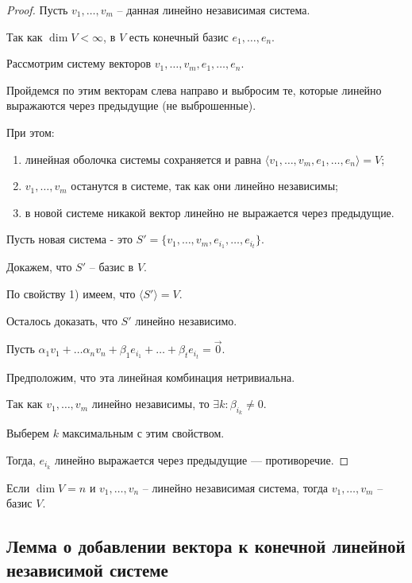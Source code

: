 \begin{proof}
    Пусть $v_1, \dots, v_m$ -- данная линейно независимая система.

    Так как $\dim V < \infty$, в $V$ есть конечный базис $e_1, \dots, e_n$.

    Рассмотрим систему векторов $v_1, \dots, v_m, e_1, \dots, e_n$.

    Пройдемся по этим векторам слева направо и выбросим те, которые линейно выражаются через предыдущие (не выброшенные).

    При этом:
    \begin{enumerate}[nosep, label=\arabic*)]
    \item линейная оболочка системы сохраняется и равна $\langle v_1, \dots, v_m, e_1, \dots, e_n \rangle = V$;
    \item $v_1, \dots, v_m$ останутся в системе, так как они линейно независимы;
    \item в новой системе никакой вектор линейно не выражается через предыдущие.
    \end{enumerate}

    Пусть новая система - это $S' = \{v_1, \dots, v_m, e_{i_1}, \dots, e_{i_t}\}$.

    Докажем, что $S'$ -- базис в $V$.

    По свойству 1) имеем, что $\langle S' \rangle = V$.

    Осталось доказать, что $S'$ линейно независимо.

    Пусть $\alpha_1 v_1 + \dots \alpha_n v_n + \beta_1 e_{i_1} + \dots + \beta_t e_{i_t} = \overrightarrow{0}$.

    Предположим, что эта линейная комбинация нетривиальна.

    Так как $v_1, \dots, v_m$ линейно независимы, то $\exists k : \beta_{i_k} \neq 0$.

    Выберем $k$ максимальным с этим свойством.

    Тогда, $e_{i_k}$ линейно выражается через предыдущие --- противоречие.
\end{proof}

\begin{corollary}
    Если $\dim V = n$ и $v_1, \dots, v_n$ -- линейно независимая система, тогда $v_1, \dots, v_m$ -- базис $V$.
\end{corollary}

\subsection{Лемма о добавлении вектора к конечной линейной независимой системе}

